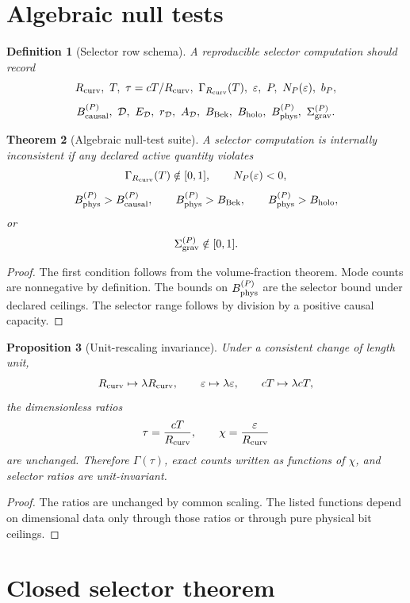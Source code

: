\documentclass[11pt,a4paper]{article}
\newtheorem{theorem}{Theorem}[section]
\newtheorem{proposition}[theorem]{Proposition}
\newtheorem{definition}[theorem]{Definition}
\begin{document}
\section{Algebraic null tests}

\begin{definition}[Selector row schema]
A reproducible selector computation should record
\[
R_{\rm curv},\ T,\ \tau=cT/R_{\rm curv},\ \Gamma_{R_{\rm curv}}(T),\ \varepsilon,\ P,\ N_P(\varepsilon),\ b_P,
\]
\[
B_{\rm causal}^{(P)},\ \mathcal D,\ E_{\mathcal D},\ r_{\mathcal D},\ A_{\mathcal D},
\ B_{\rm Bek},\ B_{\rm holo},\ B_{\rm phys}^{(P)},\ \Sigma_{\rm grav}^{(P)}.
\]
\end{definition}

\begin{theorem}[Algebraic null-test suite]
A selector computation is internally inconsistent if any declared active quantity violates
\[
\Gamma_{R_{\rm curv}}(T)\notin[0,1],\qquad
N_P(\varepsilon)<0,
\]
\[
B_{\rm phys}^{(P)}>B_{\rm causal}^{(P)},\qquad
B_{\rm phys}^{(P)}>B_{\rm Bek},\qquad
B_{\rm phys}^{(P)}>B_{\rm holo},
\]
or
\[
\Sigma_{\rm grav}^{(P)}\notin[0,1].
\]
\end{theorem}
\begin{proof}
The first condition follows from the volume-fraction theorem.  Mode counts are nonnegative by definition.  The bounds on $B_{\rm phys}^{(P)}$ are the selector bound under declared ceilings.  The selector range follows by division by a positive causal capacity.
\end{proof}

\begin{proposition}[Unit-rescaling invariance]
Under a consistent change of length unit,
\[
R_{\rm curv}\mapsto \lambda R_{\rm curv},
\qquad
\varepsilon\mapsto \lambda\varepsilon,
\qquad
cT\mapsto \lambda cT,
\]
the dimensionless ratios
\[
\tau=\frac{cT}{R_{\rm curv}},
\qquad
\chi=\frac{\varepsilon}{R_{\rm curv}}
\]
are unchanged.  Therefore $\Gamma(\tau)$, exact counts written as functions of $\chi$, and selector ratios are unit-invariant.
\end{proposition}
\begin{proof}
The ratios are unchanged by common scaling.  The listed functions depend on dimensional data only through those ratios or through pure physical bit ceilings.
\end{proof}

\section{Closed selector theorem}
\end{document}
